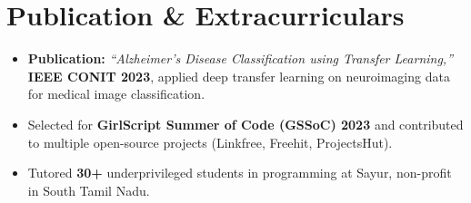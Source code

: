 \documentclass[letterpaper,10pt]{article}
\begin{document}
  \section{Publication \& Extracurriculars}
  \begin{itemize}[leftmargin=0.18in, itemsep=0pt, topsep=1pt]
    \item\small \textbf{Publication:} \textit{``Alzheimer's Disease Classification using Transfer Learning,''} \textbf{IEEE CONIT 2023}, applied deep transfer learning on neuroimaging data for medical image classification.
    \item\small Selected for \textbf{GirlScript Summer of Code (GSSoC) 2023} and contributed to multiple open-source projects (Linkfree, Freehit, ProjectsHut).
    \item\small Tutored \textbf{30+} underprivileged students in programming at Sayur, non-profit in South Tamil Nadu.
  \end{itemize}
  \vspace{-6pt}
  
\end{document}
